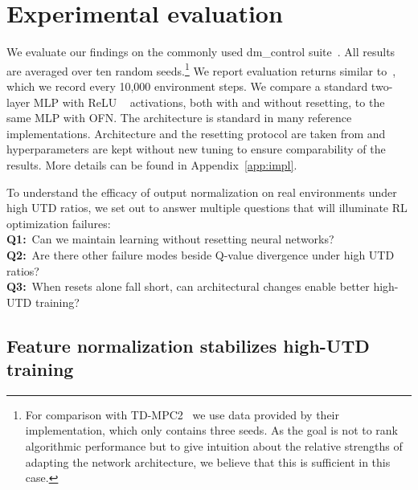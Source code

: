 \section{Experimental evaluation}

We evaluate our findings on the commonly used \textsf{dm\_control} suite~\parencite{tunyasuvunakool2020dmcontrol}. All results are averaged over ten random seeds.\footnote{For comparison with TD-MPC2~\parencite{hansen2024tdmpc} we use data provided by their implementation, which only contains three seeds. As the goal is not to rank algorithmic performance but to give intuition about the relative strengths of adapting the network architecture, we believe that this is sufficient in this case.} We report evaluation returns similar to~\textcite{nikishin2022primacy}, which we record every 10,000 environment steps. We compare a standard two-layer MLP with ReLU ~\parencite{nair2010rectified} activations, both with and without resetting, to the same MLP with OFN. %
The architecture is standard in many reference implementations. Architecture and the resetting protocol are taken from \textcite{doro2023barrier} and hyperparameters are kept without new tuning to ensure comparability of the results. More details can be found in Appendix~\ref{app:impl}.

To understand the efficacy of output normalization on real environments under high UTD ratios, we set out to answer multiple questions that will illuminate RL optimization failures:\\
{\bf Q1:}~Can we maintain learning without resetting neural networks?\\
{\bf Q2:}~Are there other failure modes beside Q-value divergence under high UTD ratios?\\
{\bf Q3:}~When resets alone fall short, can architectural changes enable better high-UTD training?

\subsection{Feature normalization stabilizes high-UTD training} 

